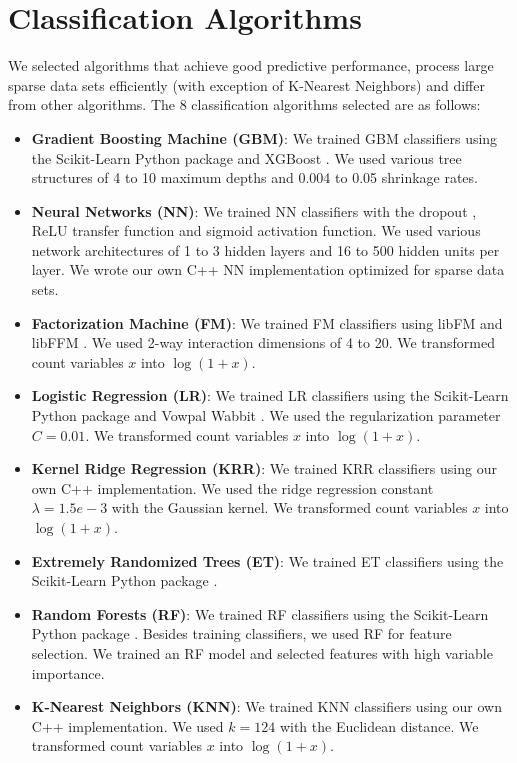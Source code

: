 \section{Classification Algorithms}
We selected algorithms that achieve good predictive performance, process large sparse data sets efficiently (with exception of K-Nearest Neighbors) and differ from other algorithms.  The 8 classification algorithms selected are as follows:
\begin{itemize}
\setlength\itemsep{0em}
\item \textbf{Gradient Boosting Machine (GBM)}: We trained GBM classifiers using the Scikit-Learn Python package \cite{scikit-learn} and XGBoost \cite{chen2015xgboost}.  We used various tree structures of 4 to 10 maximum depths and 0.004 to 0.05 shrinkage rates.
\item \textbf{Neural Networks (NN)}: We trained NN classifiers with the dropout \cite{srivastava2014dropout}, ReLU transfer function and sigmoid activation function.  We used various network architectures of 1 to 3 hidden layers and 16 to 500 hidden units per layer.  We wrote our own C++ NN implementation optimized for sparse data sets.  
\item \textbf{Factorization Machine (FM)}: We trained FM classifiers using libFM \cite{rendle2012factorization} and libFFM \cite{libffm}.  We used 2-way interaction dimensions of 4 to 20.  We transformed count variables $x$ into $\log{(1 + x)}$.
\item \textbf{Logistic Regression (LR)}: We trained LR classifiers using the Scikit-Learn Python package \cite{scikit-learn} and Vowpal Wabbit \cite{langford2007vowpal}.  We used the regularization parameter $C=0.01$.  We transformed count variables $x$ into $\log{(1 + x)}$.
\item \textbf{Kernel Ridge Regression (KRR)}: We trained KRR classifiers using our own C++ implementation.  We used the ridge regression constant $\lambda=1.5e-3$ with the Gaussian kernel.  We transformed count variables $x$ into $\log{(1 + x)}$.
\item \textbf{Extremely Randomized Trees (ET)}: We trained ET classifiers using the Scikit-Learn Python package \cite{scikit-learn}.
\item \textbf{Random Forests (RF)}: We trained RF classifiers using the Scikit-Learn Python package \cite{scikit-learn}.  Besides training classifiers, we used RF for feature selection.  We trained an RF model and selected features with high variable importance.
\item \textbf{K-Nearest Neighbors (KNN)}: We trained KNN classifiers using our own C++ implementation.  We used $k=124$ with the Euclidean distance.  We transformed count variables $x$ into $\log{(1 + x)}$.
\end{itemize}